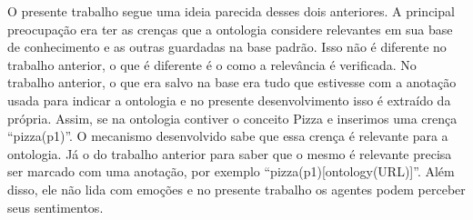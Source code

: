 O presente trabalho segue uma ideia parecida desses dois anteriores. A
principal preocupação era ter as crenças que a ontologia considere relevantes
em sua base de conhecimento e as outras guardadas na base padrão. Isso não é
diferente no trabalho anterior, o que é diferente é o como a relevância é
verificada. No trabalho anterior, o que era salvo na base era tudo que estivesse com a
anotação usada para indicar a ontologia e no presente desenvolvimento isso é
extraído da própria. Assim, se na ontologia contiver
o conceito Pizza e inserimos uma crença ``pizza(p1)''. O mecanismo
desenvolvido sabe que essa crença é relevante para a ontologia. Já o do
trabalho anterior para saber que o mesmo é relevante precisa ser marcado
com uma anotação, por exemplo ``pizza(p1)[ontology(URL)]''. Além disso, ele
não lida com emoções e no presente trabalho os agentes podem perceber seus
sentimentos.

